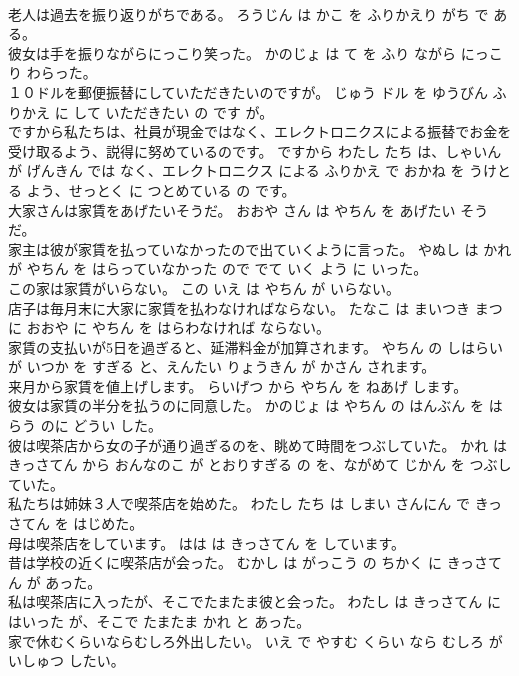 \documentclass[8pt]{extreport}
\begin{document}
\begin{CJK}{UTF8}{min}
\\	老人は過去を振り返りがちである。	ろうじん は かこ を ふりかえり がち で ある。	
\\	彼女は手を振りながらにっこり笑った。	かのじょ は て を ふり ながら にっこり わらった。	
\\	１０ドルを郵便振替にしていただきたいのですが。	じゅう ドル を ゆうびん ふりかえ に して いただきたい の です が。	
\\	ですから私たちは、社員が現金ではなく、エレクトロニクスによる振替でお金を受け取るよう、説得に努めているのです。	ですから わたし たち は、しゃいん が げんきん では なく、エレクトロニクス による ふりかえ で おかね を うけとる よう、せっとく に つとめている の です。	
\\	大家さんは家賃をあげたいそうだ。	おおや さん は やちん を あげたい そう だ。	
\\	家主は彼が家賃を払っていなかったので出ていくように言った。	やぬし は かれ が やちん を はらっていなかった ので でて いく よう に いった。	
\\	この家は家賃がいらない。	この いえ は やちん が いらない。	
\\	店子は毎月末に大家に家賃を払わなければならない。	たなこ は まいつき まつ に おおや に やちん を はらわなければ ならない。	
\\	家賃の支払いが5日を過ぎると、延滞料金が加算されます。	やちん の しはらい が いつか を すぎる と、えんたい りょうきん が かさん されます。	
\\	来月から家賃を値上げします。	らいげつ から やちん を ねあげ します。	
\\	彼女は家賃の半分を払うのに同意した。	かのじょ は やちん の はんぶん を はらう のに どうい した。	
\\	彼は喫茶店から女の子が通り過ぎるのを、眺めて時間をつぶしていた。	かれ は きっさてん から おんなのこ が とおりすぎる の を、ながめて じかん を つぶしていた。	
\\	私たちは姉妹３人で喫茶店を始めた。	わたし たち は しまい さんにん で きっさてん を はじめた。	
\\	母は喫茶店をしています。	はは は きっさてん を しています。	
\\	昔は学校の近くに喫茶店が会った。	むかし は がっこう の ちかく に きっさてん が あった。	
\\	私は喫茶店に入ったが、そこでたまたま彼と会った。	わたし は きっさてん に はいった が、そこで たまたま かれ と あった。	
\\	家で休むくらいならむしろ外出したい。	いえ で やすむ くらい なら むしろ がいしゅつ したい。	

\end{CJK}
\end{document}
